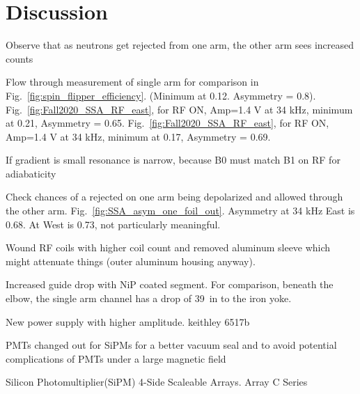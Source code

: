 
\section{Discussion}


Observe that as neutrons get rejected from one arm, the other arm sees increased counts 

Flow through measurement of single arm for comparison in Fig.~\ref{fig:spin_flipper_efficiency}. (Minimum at 0.12. Asymmetry = 0.8). Fig.~\ref{fig:Fall2020_SSA_RF_east}, for RF ON, Amp=1.4 V at 34 kHz, minimum at 0.21, Asymmetry = 0.65. Fig.~\ref{fig:Fall2020_SSA_RF_east}, for RF ON, Amp=1.4 V at 34 kHz, minimum at 0.17, Asymmetry = 0.69.

If gradient is small resonance is narrow, because B0 must match B1 on RF for adiabaticity

Check chances of a rejected on one arm being depolarized and allowed through the other arm. Fig.~\ref{fig:SSA_asym_one_foil_out}. Asymmetry at 34 kHz East is 0.68. At West is 0.73, not particularly meaningful.

Wound RF coils with higher coil count and removed aluminum sleeve which might attenuate things (outer aluminum housing anyway).

Increased guide drop with NiP coated segment. For comparison, beneath the elbow, the single arm channel has a drop of \qty{39}{in} to the iron yoke.

New power supply with higher amplitude. keithley 6517b

PMTs changed out for SiPMs for a better vacuum seal and to avoid potential complications of PMTs under a large magnetic field

Silicon Photomultiplier(SiPM) 4-Side Scaleable Arrays. Array C Series